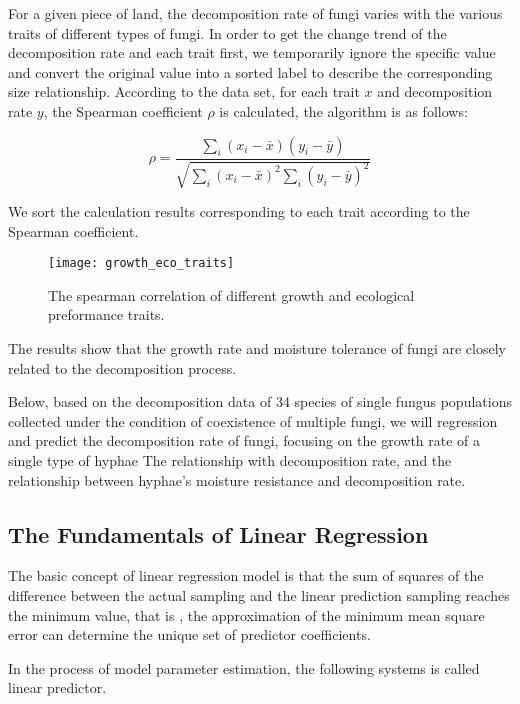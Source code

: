 \documentclass{mcmthesis}
\begin{document}
For a given piece of land, the decomposition rate of fungi varies with the various traits of different types of fungi. In order to get the change trend of the decomposition rate and each trait first, we temporarily ignore the specific value and convert the original value into a sorted label to describe the corresponding size relationship. According to the data set, for each trait $ x $ and decomposition rate $ y $, the Spearman coefficient $ \rho $ is calculated, the algorithm is as follows: 

\begin{equation}
  \rho=\frac{\sum_{i}\left(x_{i}-\bar{x}\right)\left(y_{i}-\bar{y}\right)}{\sqrt{\sum_{i}\left(x_{i}-\bar{x}\right)^{2} \sum_{i}\left(y_{i}-\bar{y}\right)^{2}}}
\end{equation}

We sort the calculation results corresponding to each trait according to the Spearman coefficient. 

\begin{figure}[H]
  \small
  \centering
  \texttt{[image: growth\_eco\_traits]}
  \caption{The spearman correlation of different growth and ecological preformance traits.}
  \label{growth_eco_traits}
\end{figure}

The results show that the growth rate and moisture tolerance of fungi are closely related to the decomposition process. 

Below, based on the decomposition data of 34 species of single fungus populations collected under the condition of coexistence of multiple fungi, we will regression and predict the decomposition rate of fungi, focusing on the growth rate of a single type of hyphae The relationship with decomposition rate, and the relationship between hyphae's moisture resistance and decomposition rate. 

\subsection{The Fundamentals of Linear Regression}

The basic concept of linear regression model is that the sum of squares of the difference between the actual sampling and the linear prediction sampling reaches the minimum value, that is , the approximation of the minimum mean square error can determine the unique set of predictor coefficients.\cite{cao2009linear}

In the process of model parameter estimation, the following systems is called linear predictor.
\end{document}
